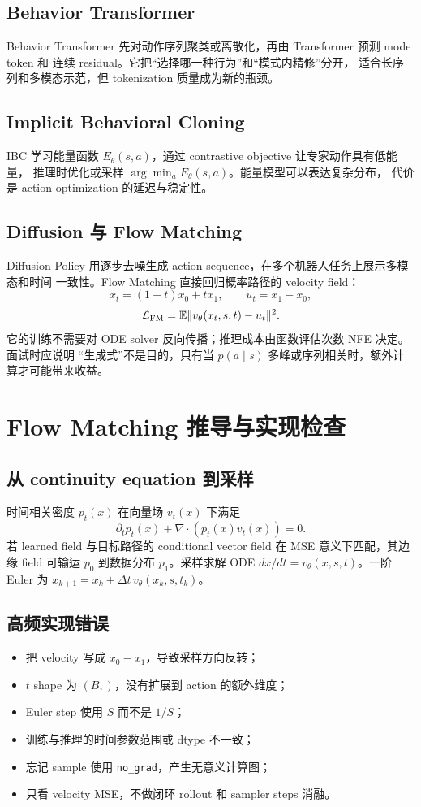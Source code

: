 \documentclass[10pt,twocolumn,a4paper]{ctexart}
\begin{document}
\subsection{Behavior Transformer}
Behavior Transformer 先对动作序列聚类或离散化，再由 Transformer 预测 mode token 和
连续 residual\citep{shafiullah2022bet}。它把“选择哪一种行为”和“模式内精修”分开，
适合长序列和多模态示范，但 tokenization 质量成为新的瓶颈。

\subsection{Implicit Behavioral Cloning}
IBC 学习能量函数 $E_\theta(s,a)$，通过 contrastive objective 让专家动作具有低能量，
推理时优化或采样
$\arg\min_a E_\theta(s,a)$\citep{florence2022implicit}。能量模型可以表达复杂分布，
代价是 action optimization 的延迟与稳定性。

\subsection{Diffusion 与 Flow Matching}
Diffusion Policy 用逐步去噪生成 action sequence，在多个机器人任务上展示多模态和时间
一致性\citep{chi2023diffusion}。Flow Matching 直接回归概率路径的 velocity field：
\[
x_t=(1-t)x_0+tx_1,\qquad u_t=x_1-x_0,
\]
\[
\mathcal L_{\rm FM}=\mathbb E\|v_\theta(x_t,s,t)-u_t\|^2.
\]
它的训练不需要对 ODE solver 反向传播；推理成本由函数评估次数 NFE 决定。面试时应说明
“生成式”不是目的，只有当 $p(a\mid s)$ 多峰或序列相关时，额外计算才可能带来收益。

\section{Flow Matching 推导与实现检查}
\subsection{从 continuity equation 到采样}
时间相关密度 $p_t(x)$ 在向量场 $v_t(x)$ 下满足
\[
  \partial_t p_t(x)+\nabla\cdot(p_t(x)v_t(x))=0.
\]
若 learned field 与目标路径的 conditional vector field 在 MSE 意义下匹配，其边缘
field 可输运 $p_0$ 到数据分布 $p_1$\citep{lipman2023flow}。采样求解 ODE
$dx/dt=v_\theta(x,s,t)$。一阶 Euler 为
$x_{k+1}=x_k+\Delta t\,v_\theta(x_k,s,t_k)$。

\subsection{高频实现错误}
\begin{itemize}
  \item 把 velocity 写成 $x_0-x_1$，导致采样方向反转；
  \item $t$ shape 为 $(B,)$，没有扩展到 action 的额外维度；
  \item Euler step 使用 $S$ 而不是 $1/S$；
  \item 训练与推理的时间参数范围或 dtype 不一致；
  \item 忘记 sample 使用 \texttt{no\_grad}，产生无意义计算图；
  \item 只看 velocity MSE，不做闭环 rollout 和 sampler steps 消融。
\end{itemize}
\end{document}
